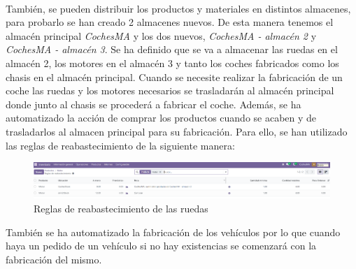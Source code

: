 \paragraph{}
También, se pueden distribuir los productos y materiales en distintos almacenes, para probarlo se han creado 2 almacenes nuevos. De esta manera tenemos el almacén principal \textit{CochesMA} y los dos nuevos, \textit{CochesMA - almacén 2} y \textit{CochesMA - almacén 3}. Se ha definido que se va a almacenar las ruedas en el almacén 2, los motores en el almacén 3 y tanto los coches fabricados como los chasis en el almacén principal. Cuando se necesite realizar la fabricación de un coche las ruedas y los motores necesarios se trasladarán al almacén principal donde junto al chasis se procederá a fabricar el coche. Además, se ha automatizado la acción de comprar los productos cuando se acaben y de trasladarlos al almacen principal para su fabricación. Para ello, se han utilizado las reglas de reabastecimiento de la siguiente manera:
\begin{figure}[h]
    \centering
    \includegraphics[width=1\linewidth]{fotosGestFab/ruedas.png}
    \caption{Reglas de reabastecimiento de las ruedas}
    \label{fig:enter-label}
\end{figure}
También se ha automatizado la fabricación de los vehículos por lo que cuando haya un pedido de un vehículo si no hay existencias se comenzará con la fabricación del mismo. 
